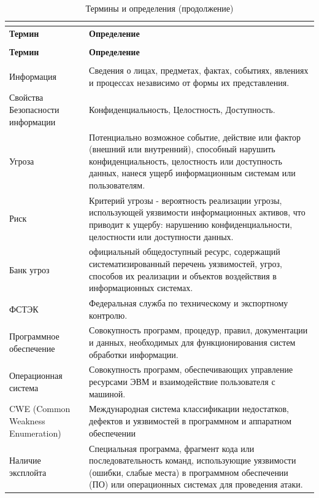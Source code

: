 \documentclass[areasetadvanced]{scrartcl}
\begin{document}
\begin{center}
\renewcommand{\arraystretch}{0.75}
\setlength{\tabcolsep}{3pt}
\begin{longtable}{>{\raggedright\arraybackslash}p{3.5cm}>{\raggedright\arraybackslash}p{9.5cm}}
\caption{Термины и определения} \\
\label{tab:terms} \\
\toprule
\textbf{Термин} & \textbf{Определение} \\
\midrule
\endfirsthead
\caption[]{Термины и определения (продолжение)} \\
\toprule
\textbf{Термин} & \textbf{Определение} \\
\midrule
\endhead
\midrule
\multicolumn{2}{r}{Продолжение на следующей странице} \\
\endfoot
\bottomrule
\endlastfoot
Информация & Сведения о лицах, предметах, фактах, событиях, явлениях и процессах независимо от формы их представления. \\
\hline
Свойства Безопасности информации &  Конфиденциальность, Целостность, Доступность. \\
\hline
Угроза & Потенциально возможное событие, действие или фактор (внешний или внутренний), способный нарушить конфиденциальность, целостность или доступность данных, нанеся ущерб информационным системам или пользователям. \\
\hline
Риск & Критерий угрозы - вероятность реализации угрозы, использующей уязвимости информационных активов, что приводит к ущербу: нарушению конфиденциальности, целостности или доступности данных. \\
\hline
Банк угроз & официальный общедоступный ресурс, содержащий систематизированный перечень уязвимостей, угроз, способов их реализации и объектов воздействия в информационных системах\cite{bdu}. \\
\hline
ФСТЭК & Федеральная служба по техническому и экспортному контролю. \\
\hline
Программное обеспечение & Совокупность программ, процедур, правил, документации и данных, необходимых для функционирования систем обработки информации. \\
\hline
Операционная система & Совокупность программ, обеспечивающих управление ресурсами ЭВМ и взаимодействие пользователя с машиной. \\
\hline
CWE (Common Weakness Enumeration) & Международная система классификации недостатков, дефектов и уязвимостей в программном и аппаратном обеспечении \\
\hline
Наличие эксплойта & Специальная программа, фрагмент кода или последовательность команд, использующие уязвимости (ошибки, слабые места) в программном обеспечении (ПО) или операционных системах для проведения атаки.\\

\end{longtable}
\end{center}
\end{document}
